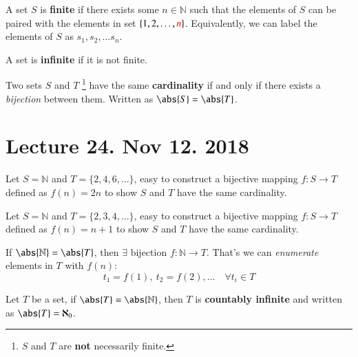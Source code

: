 \documentclass[10pt]{article}
\begin{document}
		\begin{definition}
			A set $S$ is \textbf{finite} if there exists some $n\in \mathbb{N}$ such that the elements of $S$ can be paired with the elements in set $\{1, 2, \dots, \textcolor{red}{n}\}$. Equivalently, we can label the elements of $S$ as $s_1, s_2, \dots s_n$.
		\end{definition}
		
		\begin{definition}
			A set is \textbf{infinite} if it is not finite.
		\end{definition}
		
		\begin{definition}
			Two sets $S$ and $T$ \footnote{$S$ and $T$ are \textbf{not} necessarily finite.} have the same \textbf{cardinality} if and only if there exists a \emph{bijection} between them. Written as $\abs{S} = \abs{T}$.
		\end{definition}
		
	\section{Lecture 24. Nov 12. 2018}
		\begin{example}
			Let $S = \mathbb{N}$ and $T = \{2,4,6,\dots\}$, easy to construct a bijective mapping $f:S\to T$ defined as $f(n) = 2n$ to show $S$ and $T$ have the same cardinality.
		\end{example}

		\begin{example}
			Let $S = \mathbb{N}$ and $T = \{2,3,4,\dots\}$, easy to construct a bijective mapping $f:S\to T$ defined as $f(n) = n+1$ to show $S$ and $T$ have the same cardinality.
		\end{example}
		
		\begin{remark}
			If $\abs{\mathbb{N}} = \abs{T}$, then $\exists$ bijection $f:\mathbb{N} \to T$. That's we can \emph{enumerate} elements in $T$ with $f(n)$: 
			\[
				t_1 = f(1),\ t_2 = f(2),\dots \quad \forall t_i \in T
			\]
		\end{remark}
		
		\begin{definition}
			Let $T$ be a set, if $\abs{T} = \abs{\mathbb{N}}$, then $T$ is \textbf{countably infinite} and written as $\abs{T} = \aleph_0$.
		\end{definition}
		
\end{document}
